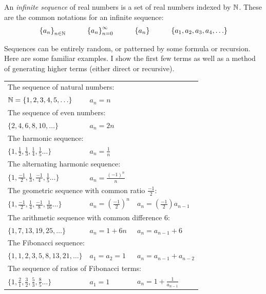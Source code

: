 \documentclass[fleqn,letterpaper]{report}
\begin{document}
\begin{defn}An \emph{infinite sequence} of real numbers is a set of real
numbers indexed by $\mathbb{N}$. These are the common notations for an
infinite sequence: 
\begin{equation*}
\left\{ a_n \right\}_{n \in \mathbb{N}} \hspace{1cm} 
\left\{ a_n \right\}_{n=0}^\infty \hspace{1cm} 
\left\{ a_n \right\} \hspace{1cm} 
\left\{ a_1, a_2, a_3, a_4, \ldots \right\}
\end{equation*}
\end{defn}
\begin{example}
Sequences can be entirely random, or patterned by some formula
or recursion. Here are some familiar examples. I show the
first few terms as well as a method of generating higher terms
(either direct or recursive). 

\begin{tabular}{lll}
\multicolumn{3}{l}{The sequence of natural numbers:} \\
$\mathbb{N} = \{ 1,2,3,4,5, \ldots \}$ & $a_n = n$ & \\
\multicolumn{3}{l}{The sequence of even numbers:} \\
$\{ 2,4,6,8,10, \ldots \}$ & $a_n = 2n$ & \\
\multicolumn{3}{l}{The harmonic sequence:} \\
$\{ 1,\frac{1}{2},\frac{1}{3},\frac{1}{4},\frac{1}{5} \ldots \}$
& $a_n = \frac{1}{n}$ & \\
\multicolumn{3}{l}{The alternating harmonic sequence:} \\
$\{ 1,\frac{-1}{2},\frac{1}{3},\frac{-1}{4},\frac{1}{5} \ldots \}$
& $a_n = \frac{(-1)^n}{n}$ & \\ 
\multicolumn{3}{l}{The geometric sequence with common ratio 
$\frac{-1}{2}:$} \\
$\{ 1,\frac{-1}{2},\frac{1}{4},\frac{-1}{8},\frac{1}{16} \ldots \}$
& $a_n = \left(\frac{-1}{2}\right)^n$ & $a_n = \left(
\frac{-1}{2} \right) a_{n-1}$ \\
\multicolumn{3}{l}{The arithmetic sequence with common
difference 6:} \\
$\{ 1,7,13,19,25, \ldots \}$ & $a_n = 1 + 6n$ & $a_n = a_{n-1} +
6$ \\
\multicolumn{3}{l}{The Fibonacci sequence:} \\
$\{1,1,2,3,5,8,13,21, \ldots \}$ & $a_1 = a_2 = 1$
& $a_n = a_{n-1} + a_{n-2}$ \\
\multicolumn{3}{l}{The sequence of ratios of Fibonacci terms:} \\
$\{ 1,\frac{2}{1},\frac{3}{2},\frac{5}{3},\frac{8}{5} \ldots \}$
& $a_1 = 1$ & $ a_n = 1 + \frac{1}{a_{n-1}}$
\end{tabular}
\end{example}
\end{document}
